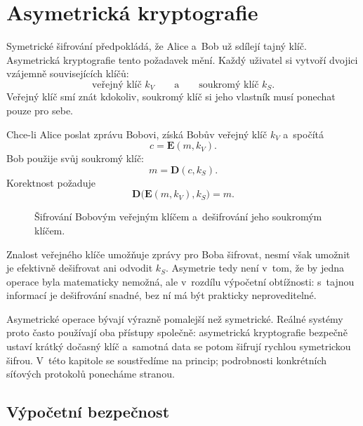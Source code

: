 \section{Asymetrická kryptografie}\label{sec:krypto-asymetricka}

Symetrické šifrování předpokládá, že Alice a~Bob už sdílejí tajný klíč. Asymetrická kryptografie tento požadavek mění. Každý uživatel si vytvoří dvojici vzájemně souvisejících klíčů:
\[
    \text{veřejný klíč }k_V
    \qquad\text{a}\qquad
    \text{soukromý klíč }k_S.
\]
Veřejný klíč smí znát kdokoliv, soukromý klíč si jeho vlastník musí ponechat pouze pro sebe.

Chce-li Alice poslat zprávu Bobovi, získá Bobův veřejný klíč $k_V$ a~spočítá
\[
    c=\mathbf{E}(m,k_V).
\]
Bob použije svůj soukromý klíč:
\[
    m=\mathbf{D}(c,k_S).
\]
Korektnost požaduje
\[
    \mathbf{D}\bigl(\mathbf{E}(m,k_V),k_S\bigr)=m.
\]

\begin{figure}[ht]
    \centering
    
    \caption{Šifrování Bobovým veřejným klíčem a~dešifrování jeho soukromým klíčem.}
    \label{fig:krypto-asymetricka}
\end{figure}

Znalost veřejného klíče umožňuje zprávy pro Boba šifrovat, nesmí však umožnit je efektivně dešifrovat ani odvodit $k_S$. Asymetrie tedy není v~tom, že by jedna operace byla matematicky nemožná, ale v~rozdílu výpočetní obtížnosti: s~tajnou informací je dešifrování snadné, bez ní má být prakticky neproveditelné.


Asymetrické operace bývají výrazně pomalejší než symetrické. Reálné systémy proto často používají oba přístupy společně: asymetrická kryptografie bezpečně ustaví krátký dočasný klíč a~samotná data se potom šifrují rychlou symetrickou šifrou. V~této kapitole se soustředíme na princip; podrobnosti konkrétních síťových protokolů ponecháme stranou.

\subsection{Výpočetní bezpečnost}

